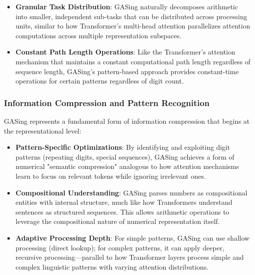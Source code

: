 \begin{itemize}
\item \textbf{Granular Task Distribution}: GASing naturally decomposes arithmetic into smaller, independent sub-tasks that can be distributed across processing units, similar to how Transformer's multi-head attention parallelizes attention computations across multiple representation subspaces.
\end{itemize}

\begin{itemize}
\item \textbf{Constant Path Length Operations}: Like the Transformer's attention mechanism that maintains a constant computational path length regardless of sequence length, GASing's pattern-based approach provides constant-time operations for certain patterns regardless of digit count.
\end{itemize}
\subsubsection{Information Compression and Pattern Recognition}

GASing represents a fundamental form of information compression that begins at the representational level:

\begin{itemize}
\item \textbf{Pattern-Specific Optimizations}: By identifying and exploiting digit patterns (repeating digits, special sequences), GASing achieves a form of numerical "semantic compression" analogous to how attention mechanisms learn to focus on relevant tokens while ignoring irrelevant ones.
\end{itemize}

\begin{itemize}
\item \textbf{Compositional Understanding}: GASing parses numbers as compositional entities with internal structure, much like how Transformers understand sentences as structured sequences. This allows arithmetic operations to leverage the compositional nature of numerical representation itself.
\end{itemize}

\begin{itemize}
\item \textbf{Adaptive Processing Depth}: For simple patterns, GASing can use shallow processing (direct lookup); for complex patterns, it can apply deeper, recursive processing—parallel to how Transformer layers process simple and complex linguistic patterns with varying attention distributions.
\end{itemize}
